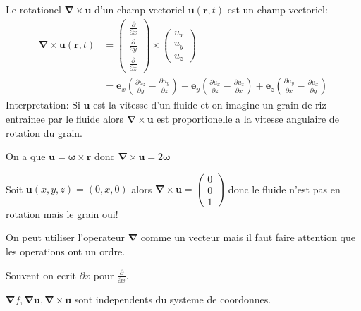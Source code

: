 \begin{definition}[Rotationel]
Le rotationel $\boldsymbol{\nabla \times u}$ d'un champ vectoriel $\boldsymbol{u}(\boldsymbol{r},t)$ est un champ vectoriel:
\begin{align*}
    \boldsymbol{\nabla \times u}(\boldsymbol{r},t) &=\begin{pmatrix}
    \frac{ \partial  }{ \partial x }  \\
    \frac{ \partial  }{ \partial y }  \\
    \frac{ \partial  }{ \partial z }  
    \end{pmatrix}\times \begin{pmatrix}
    u_{x} \\
    u_{y} \\
    u_{z}
    \end{pmatrix}\\
    &=\boldsymbol{e}_{x}\left( \frac{ \partial u_{z} }{ \partial y }-\frac{ \partial u_{y} }{ \partial z }   \right)+\boldsymbol{e}_{y}\left( \frac{ \partial u_{x} }{ \partial z } -\frac{ \partial u_{z} }{ \partial x }  \right)+\boldsymbol{e}_{z}\left( \frac{ \partial u_{y} }{ \partial x } -\frac{ \partial u_{x} }{ \partial y }  \right)
\end{align*}
Interpretation: Si $\boldsymbol{u}$ est la vitesse d'un fluide et on imagine un grain de riz entrainee par le fluide alors $\boldsymbol{\nabla \times u}$ est proportionelle a la vitesse angulaire de rotation du grain.
\end{definition}
\begin{example}
On a que $\boldsymbol{u}=\boldsymbol{\omega\times r}$ donc $\boldsymbol{\nabla \times u}=2\boldsymbol{\omega}$
\end{example}
\begin{example}
Soit $\boldsymbol{u}(x,y,z)=(0,x,0)$ alors $\boldsymbol{\nabla \times u}=\begin{pmatrix}0 \\ 0 \\ 1 \end{pmatrix}$ donc le fluide n'est pas en rotation mais le grain oui!
\end{example}
\begin{remark}
On peut utiliser l'operateur $\boldsymbol{\nabla}$ comme un vecteur mais il faut faire attention que les operations ont un ordre.
\end{remark}
\begin{remark}
Souvent on ecrit $\partial x$ pour $\frac{ \partial  }{ \partial x }$.
\end{remark}
\begin{remark}
$\boldsymbol{\nabla }f,\boldsymbol{\nabla u},\boldsymbol{\nabla}\times \boldsymbol{u}$ sont independents du systeme de coordonnes. 
\end{remark}

